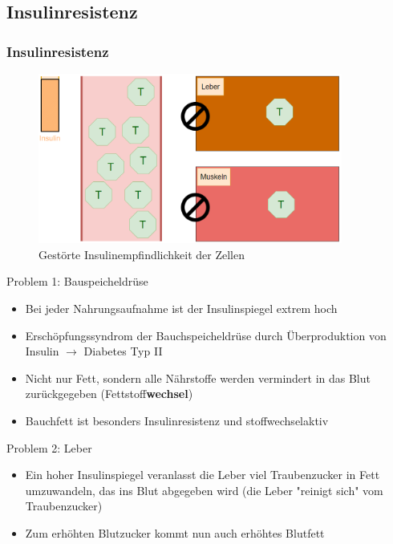 \documentclass[xcolor=dvipsnames]{beamer}
\begin{document}
    \subsection{Insulinresistenz}
    \begin{frame}[allowframebreaks]
        \frametitle{Insulinresistenz}

        \begin{figure}
            \centering
            \includegraphics[width=10cm]{../images/resistenz.png}
            \caption{Gestörte Insulinempfindlichkeit der Zellen}
        \end{figure}

        \framebreak

        \begin{block}{Problem 1: Bauspeicheldrüse}
            \begin{itemize}
                \setlength\itemsep{1em}
                \item Bei jeder Nahrungsaufnahme ist der Insulinspiegel extrem hoch
                \item Erschöpfungssyndrom der Bauchspeicheldrüse durch Überproduktion von Insulin $\rightarrow$ Diabetes Typ II
                \item Nicht nur Fett, sondern alle Nährstoffe werden vermindert in das Blut zurückgegeben (Fettstoff\textbf{wechsel})
                \item Bauchfett ist besonders Insulinresistenz und stoffwechselaktiv
            \end{itemize}
        \end{block}

        \framebreak

        \begin{block}{Problem 2: Leber}
            \begin{itemize}
                \item Ein hoher Insulinspiegel veranlasst die Leber viel Traubenzucker in Fett umzuwandeln, das ins Blut abgegeben wird (die Leber "reinigt sich" vom Traubenzucker)
                \item Zum erhöhten Blutzucker kommt nun auch erhöhtes Blutfett
            \end{itemize}
        \end{block}


\end{frame}
\end{document}
